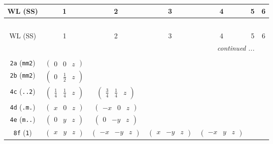 \documentclass[fleqn,9pt,landscape]{jsarticle}
\begin{document}
\begin{center}
\renewcommand{\arraystretch}{1.2}
\begin{longtable}{ccccccc}
 \hline \hline
WL (SS) & 1 & 2 & 3 & 4 & 5 & 6 \\ \hline \endfirsthead

\multicolumn{6}{l}{\tablename\ \thetable{}} \\
 \hline \hline
WL (SS) & 1 & 2 & 3 & 4 & 5 & 6 \\ \hline \endhead

 \hline \hline
\multicolumn{6}{r}{\footnotesize\it continued ...} \\ \endfoot

 \hline \hline
\multicolumn{6}{r}{} \\ \endlastfoot

{\tt 2a} ({\tt mm2}) & $ \begin{pmatrix} 0 & 0 & z \end{pmatrix} $ & $  $ & $  $ & $  $ \\ \hline
{\tt 2b} ({\tt mm2}) & $ \begin{pmatrix} 0 & \frac{1}{2} & z \end{pmatrix} $ & $  $ & $  $ & $  $ \\ \hline
{\tt 4c} ({\tt ..2}) & $ \begin{pmatrix} \frac{1}{4} & \frac{1}{4} & z \end{pmatrix} $ & $ \begin{pmatrix} \frac{3}{4} & \frac{1}{4} & z \end{pmatrix} $ & $  $ & $  $ \\ \hline
{\tt 4d} ({\tt .m.}) & $ \begin{pmatrix} x & 0 & z \end{pmatrix} $ & $ \begin{pmatrix} - x & 0 & z \end{pmatrix} $ & $  $ & $  $ \\ \hline
{\tt 4e} ({\tt m..}) & $ \begin{pmatrix} 0 & y & z \end{pmatrix} $ & $ \begin{pmatrix} 0 & - y & z \end{pmatrix} $ & $  $ & $  $ \\ \hline
{\tt 8f} ({\tt 1}) & $ \begin{pmatrix} x & y & z \end{pmatrix} $ & $ \begin{pmatrix} - x & - y & z \end{pmatrix} $ & $ \begin{pmatrix} x & - y & z \end{pmatrix} $ & $ \begin{pmatrix} - x & y & z \end{pmatrix} $ \\
\end{longtable}
\end{center}
\end{document}
